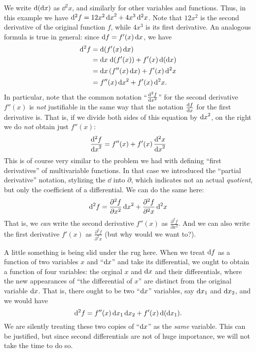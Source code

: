 We write $\mathrm{d}({\mathrm{d} x})$ as $\dd^2x$, and similarly for other variables and functions.
Thus, in this example we have $\mathrm{d}^2f = 12x^2\,{\mathrm{d} x}^2 + 4x^3 \, \mathrm{d}^2x$.
Note that $12x^2$ is the second derivative of the original function $f$, while $4x^3$ is its first derivative.
An analogous formula is true in general: since ${\mathrm{d} f} = f'(x) \,{\mathrm{d} x}$, we have
\begin{align}
  \mathrm{d}^2f &= \mathrm{d}(f'(x)\,{\mathrm{d} x}) \notag\\
  &= {\mathrm{d} x} \;\mathrm{d}(f'(x)) + f'(x) \, \mathrm{d}({\mathrm{d} x}) \notag\\
  &= {\mathrm{d} x} \,(f''(x)\, {\mathrm{d} x}) + f'(x) \, \mathrm{d}^2x \notag\\
  &= f''(x) \,{\mathrm{d} x}^2 + f'(x) \,\mathrm{d}^2x.\label{eq:second-differential}
\end{align}
In particular, note that the common notation ``$\frac{\mathrm{d}^2f}{{\mathrm{d} x}^2}$'' for the second derivative $f''(x)$ is \emph{not} justifiable in the same way that the notation $\frac{{\mathrm{d} f}}{{\mathrm{d} x}}$ for the first derivative is.
That is, if we divide both sides of this equation by ${\mathrm{d} x}^2$, on the right we do \emph{not} obtain just $f''(x)$:
\[ \frac{\mathrm{d}^2f}{{\mathrm{d} x}^2} = f''(x) + f'(x) \, \frac{\mathrm{d}^2x}{{\mathrm{d} x}^2} \]
This is of course very similar to the problem we had with defining ``first derivatives'' of multivariable functions.
In that case we introduced the ``partial derivative'' notation, stylizing the $\dd$ into $\partial$, which indicates not an actual \emph{quotient}, but only the coefficient of a differential.
We can do the same here:
\[ \mathrm{d}^2 f = \frac{\partial^2 f}{\partial x^2} \,{\mathrm{d} x}^2 + \frac{\partial^2 f}{\partial^2 x} \,\mathrm{d}^2x \]
That is, we \emph{can} write the second derivative $f''(x)$ as $\frac{\partial^2 f}{\partial x^2}$.
And we can also write the first derivative $f'(x)$ as $\frac{\partial^2 f}{\partial^2 x}$ (but why would we want to?).

\begin{adv}
  A little something is being slid under the rug here.
  When we treat ${\mathrm{d} f}$ as a function of two variables $x$ and ``${\mathrm{d} x}$'' and take its differential, we ought to obtain a function of four variables: the orginal $x$ and ${\mathrm{d} x}$ and their differentials, where the new appearances of ``the differential of $x$'' are distinct from the original variable ${\mathrm{d} x}$.
  That is, there ought to be two ``${\mathrm{d} x}$'' variables, say ${\mathrm{d} x}_1$ and ${\mathrm{d} x}_2$, and we would have
  \[ \mathrm{d}^2 f = f''(x) \,{\mathrm{d} x}_1\,{\mathrm{d} x}_2 + f'(x) \,\mathrm{d}({\mathrm{d} x}_1). \]
  We are silently treating these two copies of ``${\mathrm{d} x}$'' as the \emph{same} variable.
  This can be justified, but since second differentials are not of huge importance, we will not take the time to do so.
\end{adv}

